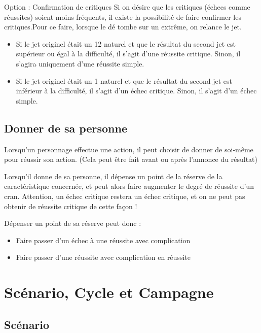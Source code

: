 \documentclass[a4paper,10pt,twoside,twocolumn,openany,bg=print]{dndbook}
\begin{document}
\begin{paperbox}{Option : Confirmation de critiques}
Si on désire que les critiques (échecs comme réussites) soient moins fréquents, il existe la possibilité de faire confirmer les critiques.Pour ce faire, lorsque le dé tombe sur un extrême, on relance le jet.

\begin{itemize}
\item Si le jet originel était un 12 naturel et que le résultat du second jet est supérieur ou égal à la difficulté, il s'agit d'une réussite critique. Sinon, il s'agira uniquement d'une réussite simple.
\item Si le jet originel était un 1 naturel et que le résultat du second jet est inférieur à la difficulté, il s'agit d'un échec critique. Sinon, il s'agit d'un échec simple.
\end{itemize}
\end{paperbox}

\subsection*{Donner de sa personne}

Lorsqu'un personnage effectue une action, il peut choisir de donner de soi-même pour réussir son action. (Cela peut être fait avant ou après l'annonce du résultat)

Lorsqu'il donne de sa personne, il dépense un point de la réserve de la caractéristique concernée, et peut alors faire augmenter le degré de réussite d'un cran. Attention, un échec critique restera un échec critique, et on ne peut pas obtenir de réussite critique de cette façon !

Dépenser un point de sa réserve peut donc :

\begin{itemize}
	\item Faire passer d'un échec à une réussite avec complication
	\item Faire passer d'une réussite avec complication en réussite
\end{itemize}

\section{Scénario, Cycle et Campagne}

\subsection*{Scénario}
\end{document}

